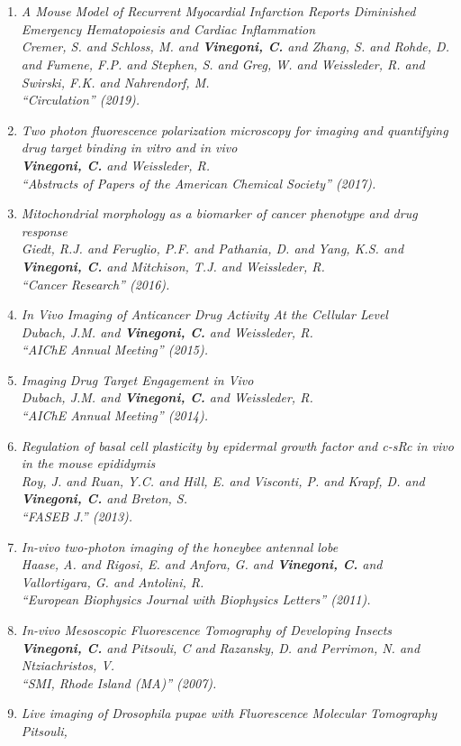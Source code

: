 \documentclass{resume}
\newcommand{\titresection}[1]
{
  \vspace{0em}
  \definecolor{gris_clair}{rgb}{0.90, 0.90, 0.90}
  \colorbox{gris_clair}{\makebox[\textwidth][l]{\rule[-0.1em]{0em}{0.5em}\large{\textsc{#1}}}} \\
}
\begin{document}
\begin{category}{~~}

\hypertarget{conferencesa}{\citemnobullet
\titresection{\textbf{\large PUBLICATIONS: CONFERENCES}}}
\begin{enumerate}

\item \it A Mouse Model of Recurrent Myocardial Infarction Reports Diminished Emergency Hematopoiesis and Cardiac Inflammation \\ Cremer, S. and Schloss, M. and {\bf Vinegoni, C.} and Zhang, S. and Rohde, D. and Fumene, F.P. and Stephen, S. and Greg, W. and Weissleder, R. and Swirski, F.K. and Nahrendorf, M. \\ ``Circulation''  (2019). \item \it Two photon fluorescence polarization microscopy for imaging and quantifying drug target binding in vitro and in vivo \\ {\bf Vinegoni, C.} and Weissleder, R. \\ ``Abstracts of Papers of the American Chemical Society''  (2017). \item \it Mitochondrial morphology as a biomarker of cancer phenotype and drug response \\ Giedt, R.J. and Feruglio, P.F. and Pathania, D. and Yang, K.S. and {\bf Vinegoni, C.} and Mitchison, T.J. and Weissleder, R. \\ ``Cancer Research''  (2016). \item \it In Vivo Imaging of Anticancer Drug Activity At the Cellular Level \\ Dubach, J.M. and {\bf Vinegoni, C.} and Weissleder, R. \\ ``AIChE Annual Meeting''  (2015). \item \it Imaging Drug Target Engagement in Vivo \\ Dubach, J.M. and {\bf Vinegoni, C.} and Weissleder, R. \\ ``AIChE Annual Meeting''  (2014). \item \it Regulation of basal cell plasticity by epidermal growth factor and c-sRc in vivo in the mouse epididymis \\ Roy, J. and Ruan, Y.C. and Hill, E. and Visconti, P. and Krapf, D. and {\bf Vinegoni, C.} and Breton, S. \\ ``FASEB J.''  (2013). \item \it In-vivo two-photon imaging of the honeybee antennal lobe \\ Haase, A. and Rigosi, E. and Anfora, G. and {\bf Vinegoni, C.} and Vallortigara, G. and Antolini, R. \\ ``European Biophysics Journal with Biophysics Letters''  (2011). \item \it In-vivo Mesoscopic Fluorescence Tomography of Developing Insects \\ {\bf Vinegoni, C.} and Pitsouli, C and Razansky, D. and Perrimon, N. and Ntziachristos, V. \\ ``SMI, Rhode Island (MA)''  (2007). \item \it Live imaging of Drosophila pupae with Fluorescence Molecular Tomography \\ Pitsouli, 
\end{enumerate}
\end{category}
\end{document}
